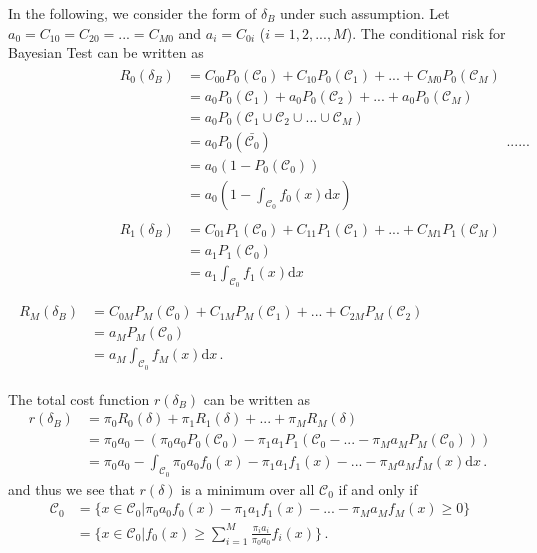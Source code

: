 In the following, we consider the form of $\delta_B$ under such assumption.
Let $a_0 = C_{10} = C_{20} = ... = C_{M0}$ and $a_i = C_{0i}$ ($i= 1, 2, ..., M$).
The conditional risk for Bayesian Test can be written as 
\begin{subequations}
\label{r0}
\begin{align}
\begin{split}
R_0(\delta_B) &= C_{00}P_0(\mathcal{C}_0) + C_{10}P_0(\mathcal{C}_1) + ... +  C_{M0}P_0(\mathcal{C}_M)\\
&= a_0P_0(\mathcal{C}_1) + a_0P_0(\mathcal{C}_2) + ... + a_0P_0(\mathcal{C}_M)\\
&= a_0P_0(\mathcal{C}_1\cup \mathcal{C}_2 \cup ... \cup \mathcal{C}_M)\\
&= a_0P_0(\bar{\mathcal{C}_0})\\
&= a_0(1 - P_0(\mathcal{C}_0))\\
&= a_0(1 - \int_{\mathcal{C}_0}f_0(x)\mathrm{d}x)\\
\end{split}
\begin{split}
R_1(\delta_B) &= C_{01}P_1(\mathcal{C}_0) + C_{11}P_1(\mathcal{C}_1) + ... +  C_{M1}P_1(\mathcal{C}_M)\\  
&= a_1P_1(\mathcal{C}_0)\\
&= a_1\int_{\mathcal{C}_0}f_1(x)\mathrm{d}x\\
\end{split}
......\\
\begin{split}
R_M(\delta_B) &= C_{0M}P_M(\mathcal{C}_0) + C_{1M}P_M(\mathcal{C}_1) + ... +  C_{2M}P_M(\mathcal{C}_2)\\
&= a_MP_M(\mathcal{C}_0)\\
&= a_M\int_{\mathcal{C}_0}f_{M}(x)\mathrm{d}x\,.
\end{split}
\end{align}
\end{subequations}

The total cost function $r(\delta_B)$ can be written as 
\begin{equation}
\begin{split}
\label{r00}
r(\delta_B) &= \pi_0 R_0(\delta) + \pi_1R_1(\delta) + ... +  \pi_MR_M(\delta)\\
&= \pi_0a_0 - (\pi_0a_0P_0(\mathcal{C}_0) - \pi_1a_1P_1(\mathcal{C}_0 - ... - \pi_Ma_MP_M(\mathcal{C}_0)))\\
&= \pi_0a_0 - \int_{\mathcal{C}_0}\pi_0a_0f_0(x) - \pi_1a_1f_1(x) - ... - \pi_Ma_Mf_M(x) \mathrm{d}x\,. 
\end{split}
\end{equation}
and thus we see that $r(\delta)$ is a minimum over all $\mathcal{C}_0$ if and only if 
\begin{equation}
\begin{split}
\label{equ: C}
\mathcal{C}_0 &= \{ x\in \mathcal{C}_0 | \pi_0a_0f_0(x) - \pi_1a_1f_1(x) - ... - \pi_Ma_Mf_M(x) \geq 0\}\\
&= \{ x\in \mathcal{C}_0 | f_0(x) \geq \sum_{i=1}^{M}\frac{\pi_ia_i}{\pi_0a_0}f_i(x) \}\,.
\end{split}
\end{equation}

